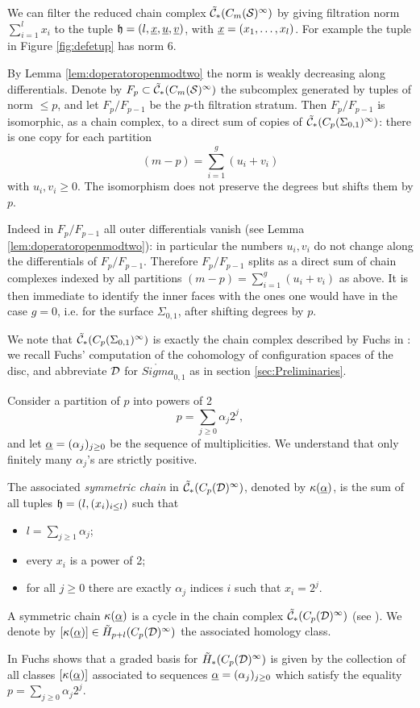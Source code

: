 We can filter the reduced chain complex $\tilde{\mathcal{C}}_*(C_m(\mathcal{S})^{\infty})$ by giving filtration norm $\sum_{i=1}^lx_i$ to
the tuple $\mathfrak{h}=(l,\underline{x},\underline{u},\underline{v})$, with $\underline{x}=(x_1,\dots,x_l)$. For example
the tuple in Figure \ref{fig:defetup} has norm 6.

By Lemma \ref{lem:doperatoropenmodtwo}
the norm is weakly decreasing along differentials. Denote by $F_p\subset\tilde{\mathcal{C}}_*(C_m(\mathcal{S})^{\infty})$ the subcomplex generated by
tuples of norm $\leq p$, and let $F_p/F_{p-1}$ be the $p$-th filtration stratum.
Then $F_p/F_{p-1}$ is isomorphic, as a chain complex, to a direct sum of copies of $\tilde{\mathcal{C}}_*(C_p(\Sigma_{0,1})^{\infty})$:
there is one copy for each partition
\[
(m-p)=\sum_{i=1}^g (u_i+v_i)
\]
with $u_i,v_i\geq 0$. The isomorphism
does not preserve the degrees but shifts them by $p$.

Indeed in $F_p/F_{p-1}$ all outer
differentials vanish (see Lemma \ref{lem:doperatoropenmodtwo}): in particular the numbers $u_i,v_i$
do not change along the differentials of $F_p/F_{p-1}$. Therefore $F_p/F_{p-1}$ splits as a direct sum
of chain complexes indexed by all partitions $(m-p)=\sum_{i=1}^g (u_i+v_i)$ as above.
It is then immediate to identify the inner faces
with the ones one would have in the case $g=0$, i.e. for the surface $\Sigma_{0,1}$, after shifting
degrees by $p$.

We note that $\tilde{\mathcal{C}}_*(C_p(\Sigma_{0,1})^{\infty})$ is exactly the chain complex described by Fuchs in
\cite{Fuchs:CohomBraidModtwo}: we recall Fuchs' computation of the cohomology of configuration
spaces of the disc, and abbreviate $\mathcal{D}$ for $\mathring{Sigma}_{0,1}$ as in section \ref{sec:Preliminaries}.
\begin{defn}
\label{defn:symchain}
Consider a partition of $p$ into powers of 2
\[
 p=\sum_{j\geq 0}\alpha_j2^j,
\]
and let $\underline{\alpha}=(\alpha_j)_{j\geq 0}$ be the sequence of multiplicities. We understand that only finitely
many $\alpha_j$'s are strictly positive.

The associated \emph{symmetric chain} in $\tilde{\mathcal{C}}_*(C_p(\mathcal{D})^{\infty})$, denoted by $\kappa(\underline{\alpha})$,
is the sum of all tuples $\mathfrak{h}=\left(l,(x_i)_{i\leq l}\right)$ such that
\begin{itemize}
 \item $l=\sum_{j\geq 1}\alpha_j$;
 \item every $x_i$ is a power of 2;
 \item for all $j\geq 0$ there are exactly $\alpha_j$ indices $i$ such that $x_i=2^j$.
\end{itemize}
A symmetric chain $\kappa(\underline{\alpha})$ is a cycle in the chain complex $\tilde{\mathcal{C}}_*(C_p(\mathcal{D})^{\infty})$ (see \cite{Fuchs:CohomBraidModtwo}).
We denote by $[\kappa(\underline{\alpha})]\in\tilde{H}_{p+l}(C_p(\mathcal{D})^{\infty})$ the associated homology class.
\end{defn}
In \cite{Fuchs:CohomBraidModtwo} Fuchs shows that a graded basis for $\tilde{H}_*(C_p(\mathcal{D})^{\infty})$
is given by the collection of all classes $[\kappa(\underline{\alpha})]$ associated to sequences $\underline{\alpha}=(\alpha_j)_{j\geq 0}$
which satisfy the equality $p=\sum_{j\geq 0}\alpha_j2^j$.


